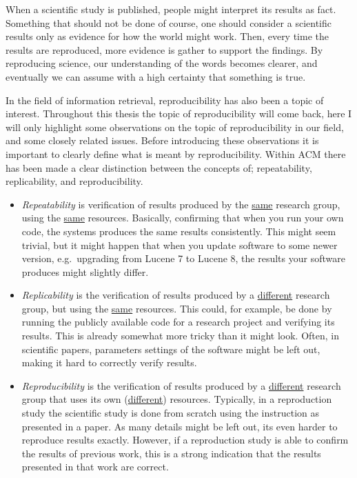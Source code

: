 When a scientific study is published, people might interpret its results as fact. Something that should not be done of course, one should consider a scientific results only as evidence for how the world might work. Then, every time the results are reproduced, more evidence is gather to support the findings. By reproducing science, our understanding of the words becomes clearer, and eventually we can assume with a high certainty that something is true. 

In the field of information retrieval, reproducibility has also been a topic of interest. Throughout this thesis the topic of reproducibility will come back, here I will only highlight some observations on the topic of reproducibility in our field, and some closely related issues. Before introducing these observations it is important to clearly define what is meant by reproducibility. Within ACM there has been made a clear distinction between the concepts of; repeatability, replicability, and reproducibility. 
\begin{itemize}
	\item \emph{Repeatability} is verification of results produced by the \underline{same} research group, using the \underline{same} resources. Basically, confirming that when you run your own code, the systems produces the same results consistently. This might seem trivial, but it might happen that when you update software to some newer version, e.g.\ upgrading from Lucene 7 to Lucene 8, the results your software produces might slightly differ. 
	\item \emph{Replicability} is the verification of results produced by a \underline{different} research group, but using the \underline{same} resources. This could, for example, be done by running the publicly available code for a research project and verifying its results. This is already somewhat more tricky than it might look. Often, in scientific papers, parameters settings of the software might be left out, making it hard to correctly verify results. 
	\item \emph{Reproducibility} is the verification of results produced by a \underline{different} research group that uses its own (\underline{different}) resources. Typically, in a reproduction study the scientific study is done from scratch using the instruction as presented in a paper. As many details might be left out, its even harder to reproduce results exactly. However, if a reproduction study is able to confirm the results of previous work, this is a strong indication that the results presented in that work are correct.
\end{itemize}

